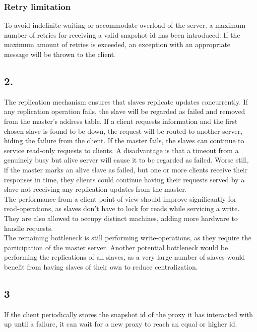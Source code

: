 \documentclass[12pt]{article}
\begin{document}
\subsubsection*{Retry limitation}
To avoid indefinite waiting or accommodate overload of the server, a maximum number of retries for receiving a valid snapshot id has been introduced. If the maximum amount of retries is exceeded, an exception with an appropriate message will be thrown to the client.

\subsection*{2.}
The replication mechanism ensures that slaves replicate updates concurrently. If any replication operation fails, the slave will be regarded as failed and removed from the master's address table. If a client requests information and the first chosen slave is found to be down, the request will be routed to another server, hiding the failure from the client. If the master fails, the slaves can continue to service read-only requests to clients. A disadvantage is that a timeout from a genuinely busy but alive server will cause it to be regarded as failed. Worse still, if the master marks an alive slave as failed, but one or more clients receive their responses in time, they clients could continue having their requests served by a slave not receiving any replication updates from the master. \\
The performance from a client point of view should improve significantly for read-operations, as slaves don't have to lock for reads while servicing a write. They are also allowed to occupy distinct machines, adding more hardware to handle requests. \\
The remaining bottleneck is still performing write-operations, as they require the participation of the master server. Another potential bottleneck would be performing the replications of all slaves, as a very large number of slaves would benefit from having slaves of their own to reduce centralization.

\subsection*{3}
If the client periodically stores the snapshot id of the proxy it has interacted with up until a failure, it can wait for a new proxy to reach an equal or higher id.
\end{document}
